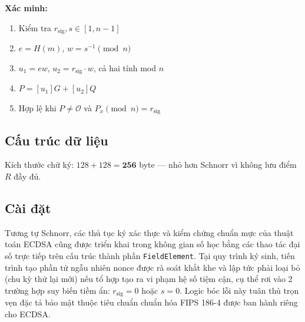 \textbf{Xác minh:}

\begin{enumerate}
\def\labelenumi{\arabic{enumi}.}
\tightlist
\item
  Kiểm tra \(r_{\text{sig}}, s \in [1, n-1]\)
\item
  \(e = H(m)\), \(w = s^{-1} \pmod{n}\)
\item
  \(u_1 = ew\), \(u_2 = r_{\text{sig}} \cdot w\), cả hai tính mod \(n\)
\item
  \(P = [u_1]G + [u_2]Q\)
\item
  Hợp lệ khi \(P \neq \mathcal{O}\) và \(P_x \pmod{n} = r_{\text{sig}}\)
\end{enumerate}

\subsection{Cấu trúc dữ
liệu}\label{cux1ea5u-truxfac-dux1eef-liux1ec7u-1}

\begin{Shaded}
\begin{Highlighting}[]
 \OperatorTok{\{}
    \OperatorTok{:}\OperatorTok{,}  
    \OperatorTok{:}\OperatorTok{,}  
\OperatorTok{\}}
\end{Highlighting}
\end{Shaded}

\label{lst:ch4_ecdsa}\vspace{12pt}

Kích thước chữ ký: \(128 + 128 = \mathbf{256}\) byte --- nhỏ hơn Schnorr
vì không lưu điểm \(R\) đầy đủ.

\subsection{Cài đặt}\label{cuxe0i-ux111ux1eb7t-1}

Tương tự Schnorr, các thủ tục ký xác thực và kiểm chứng chuẩn mực của
thuật toán ECDSA cũng được triển khai trong không gian số học bằng các
thao tác đại số trực tiếp trên cấu trúc thành phần
\texttt{FieldElement}. Tại quy trình ký sinh, tiến trình tạo phần tử
ngẫu nhiên nonce được rà soát khắt khe và lập tức phải loại bỏ (chu kỳ
thử lại mới) nếu tổ hợp tạo ra vi phạm hệ số tiệm cận, cụ thể rơi vào 2
trường hợp suy biến tiềm ẩn: \(r_{\text{sig}} = 0\) hoặc \(s = 0\).
Logic bóc lỗi này tuân thủ trọn vẹn đặc tả bảo mật thuộc tiêu chuẩn
chuẩn hóa FIPS 186-4 được ban hành riêng cho ECDSA.

